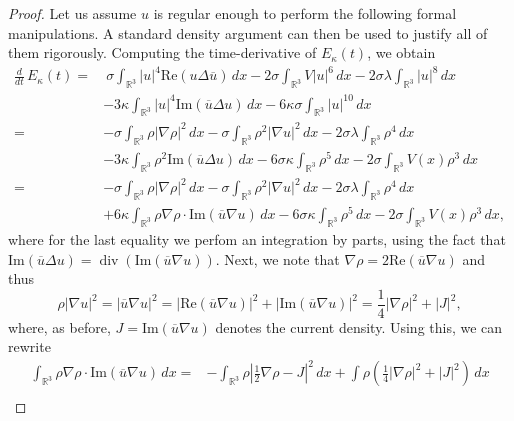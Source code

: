 \documentclass[a4paper,leqno]{amsart}
\theoremstyle{plain}
\theoremstyle{definition}
\numberwithin{equation}{section}
\begin{document}
\begin{proof} Let us assume $u$ is regular enough to perform the following formal manipulations.
A standard density argument can then be used to justify all of them rigorously.
Computing the time-derivative of $E_\kappa(t)$, we obtain
\begin{align*}
\frac{d}{dt} \, E_\kappa(t)
=&\ \sigma\int_{{{\mathbb R}}^3}|u|^4{\mathrm{Re}}(u\Delta{\overline{{u}}})\,dx-2\sigma\int_ {{{\mathbb R}}^3}V|u|^6\,dx-2\sigma\lambda\int_{{{\mathbb R}}^3}|u|^8\,dx\\
&-3\kappa\int_{{{\mathbb R}}^3}|u|^4{\mathrm{Im}}({\overline{{u}}}\Delta u)\,dx-6\kappa\sigma\int_{{{\mathbb R}}^3}|u|^{10}\, dx\\
=&-\sigma\int_{{{\mathbb R}}^3} \rho|\nabla\rho|^2\, d x-\sigma\int_{{{\mathbb R}}^3}\rho^2|\nabla u|^2\, d x-2\sigma\lambda\int_{{{\mathbb R}}^3}\rho^4\, d x\\
&-3\kappa \int_{{{\mathbb R}}^3}\rho^2{\mathrm{Im}}({\overline{{u}}}\Delta u)\, d x-6\sigma \kappa \int_{{{\mathbb R}}^3}\rho^5\, d x - 2\sigma \int_{{{\mathbb R}}^3} V(x) \rho^3 \, dx\\
=&-\sigma\int_{{{\mathbb R}}^3}\rho|\nabla\rho|^2\, d x-\sigma\int_{{{\mathbb R}}^3}\rho^2|\nabla u|^2\, d x-2\sigma\lambda\int_{{{\mathbb R}}^3}\rho^4\, d x\\
&+6\kappa \int_{{{\mathbb R}}^3}\rho\nabla\rho\cdot {\mathrm{Im}}({\overline{{u}}}\nabla u) \, d x-6\sigma \kappa \int_{{{\mathbb R}}^3}\rho^5\, d x - 2\sigma \int_{{{\mathbb R}}^3} V(x) \rho^3 \, dx,
\end{align*}
where for the last equality we perfom an integration by parts, using the fact that
${\mathrm{Im}}({\overline{{u}}}\Delta u)=\operatorname{div}{\left({{\mathrm{Im}}({\overline{{u}}}\nabla u)}\right)}$.
Next, we note that $\nabla\rho=2{\mathrm{Re}}({\overline{{u}}}\nabla u)$ and thus
\begin{equation*}
\rho|\nabla u|^2 =|{\overline{{u}}}\nabla u|^2= |{\mathrm{Re}}({\overline{{u}}}\nabla u)|^2+|{\mathrm{Im}}({\overline{{u }}}\nabla u)|^2 = {\frac{1}{{4}}}|\nabla\rho|^2+|J|^2,
\end{equation*}
where, as before, $J={\mathrm{Im}}({\overline{{u}}}\nabla u)$ denotes the current density. Using this, we can rewrite
\begin{align*}
\int_{{{\mathbb R}}^3}\rho\nabla\rho\cdot{\mathrm{Im}}({\overline{{u}}}\nabla u) \, d x
=& -\int_{{{\mathbb R}}^3}\rho{\left|{{\frac{1}{2}}\nabla\rho-J}\right|}^2\, d x
+\int\rho{\left({{\frac{1}{{4}}}|\nabla\rho|^2+|J|^2}\right)}\, d x\\

\end{align*}
\end{proof}
\end{document}
